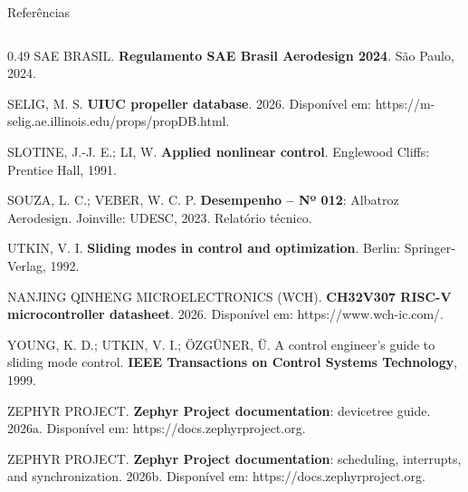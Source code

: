 \begin{frame}{Referências}
\begin{columns}[t]
\begin{column}{0.49\textwidth}
      SAE BRASIL. \textbf{Regulamento SAE Brasil Aerodesign 2024}. São
      Paulo, 2024.

      SELIG, M. S. \textbf{UIUC propeller database}. 2026. Disponível em:
      https://m-selig.ae.illinois.edu/props/propDB.html.

      SLOTINE, J.-J. E.; LI, W. \textbf{Applied nonlinear control}.
      Englewood Cliffs: Prentice Hall, 1991.

      SOUZA, L. C.; VEBER, W. C. P. \textbf{Desempenho -- Nº 012}:
      Albatroz Aerodesign. Joinville: UDESC, 2023. Relatório técnico.

      UTKIN, V. I. \textbf{Sliding modes in control and optimization}.
      Berlin: Springer-Verlag, 1992.

      NANJING QINHENG MICROELECTRONICS (WCH). \textbf{CH32V307 RISC-V
      microcontroller datasheet}. 2026. Disponível em: https://www.wch-ic.com/.

      YOUNG, K. D.; UTKIN, V. I.; ÖZGÜNER, Ü. A control engineer's guide to
      sliding mode control. \textbf{IEEE Transactions on Control Systems
      Technology}, 1999.

      ZEPHYR PROJECT. \textbf{Zephyr Project documentation}: devicetree
      guide. 2026a. Disponível em: https://docs.zephyrproject.org.

      ZEPHYR PROJECT. \textbf{Zephyr Project documentation}: scheduling,
      interrupts, and synchronization. 2026b. Disponível em:
      https://docs.zephyrproject.org.
    \end{column}
  \end{columns}
\end{frame}
